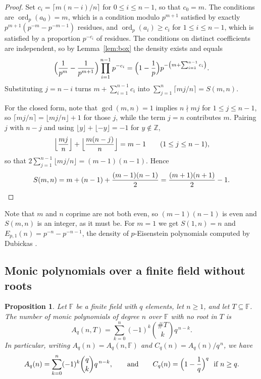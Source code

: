 \documentclass[11pt,reqno]{amsart}
\theoremstyle{plain}
\newtheorem{proposition}[theorem]{Proposition}
\theoremstyle{definition}
\theoremstyle{remark}
\newcommand{\Z}{\mathbb{Z}}
\newcommand{\F}{\mathbb{F}}
\newcommand{\ord}{\operatorname{ord}}
\begin{document}
\begin{proof}
Set $c_i=\lceil m(n-i)/n\rceil$ for $0\le i\le n-1$, so that $c_0=m$. The conditions are
$\ord_p(a_0)=m$, which is a condition modulo $p^{m+1}$ satisfied by exactly
$p^{m+1}(p^{-m}-p^{-m-1})$ residues, and $\ord_p(a_i)\ge c_i$ for $1\le i\le n-1$, which is satisfied
by a proportion $p^{-c_i}$ of residues. The conditions on distinct coefficients are independent,
so by Lemma~\ref{lem:box} the density exists and equals
\[
  \Bigl(\frac1{p^{m}}-\frac1{p^{m+1}}\Bigr)\prod_{i=1}^{n-1}p^{-c_i}
  =\Bigl(1-\frac1p\Bigr)p^{-\left(m+\sum_{i=1}^{n-1}c_i\right)} .
\]
Substituting $j=n-i$ turns $m+\sum_{i=1}^{n-1}c_i$ into $\sum_{j=1}^{n}\lceil mj/n\rceil=S(m,n)$.

For the closed form, note that $\gcd(m,n)=1$ implies $n\nmid mj$ for $1\le j\le n-1$, so
$\lceil mj/n\rceil=\lfloor mj/n\rfloor+1$ for those $j$, while the term $j=n$ contributes $m$.
Pairing $j$ with $n-j$ and using $\lfloor y\rfloor+\lfloor -y\rfloor=-1$ for $y\notin\Z$,
\[
  \Bigl\lfloor\frac{mj}{n}\Bigr\rfloor+\Bigl\lfloor\frac{m(n-j)}{n}\Bigr\rfloor=m-1
  \qquad(1\le j\le n-1),
\]
so that $2\sum_{j=1}^{n-1}\lfloor mj/n\rfloor=(m-1)(n-1)$. Hence
\[
  S(m,n)=m+(n-1)+\frac{(m-1)(n-1)}{2}=\frac{(m+1)(n+1)}{2}-1 . \qedhere
\]
\end{proof}

Note that $m$ and $n$ coprime are not both even, so $(m-1)(n-1)$ is even and $S(m,n)$ is an
integer, as it must be. For $m=1$ we get $S(1,n)=n$ and
$E_{p,1}(n)=p^{-n}-p^{-n-1}$, the density of $p$-Eisenstein polynomials computed by Dubickas
\cite{Dubickas}.

\subsection{Monic polynomials over a finite field without roots}

\begin{proposition}\label{prop:rootless}
Let $\F$ be a finite field with $q$ elements, let $n\ge 1$, and let $T\subseteq\F$. The number of
monic polynomials of degree $n$ over $\F$ with no root in $T$ is
\[
  A_q(n,T)=\sum_{k=0}^{n}(-1)^k\binom{\#T}{k}q^{\,n-k} .
\]
In particular, writing $A_q(n)=A_q(n,\F)$ and $C_q(n)=A_q(n)/q^{\,n}$, we have
\[
  A_q(n)=\sum_{k=0}^n(-1)^k\binom{q}{k}q^{\,n-k},
  \qquad\text{and}\qquad
  C_q(n)=\Bigl(1-\frac1q\Bigr)^{q}\ \text{ if } n\ge q .
\]
\end{proposition}
\end{document}
